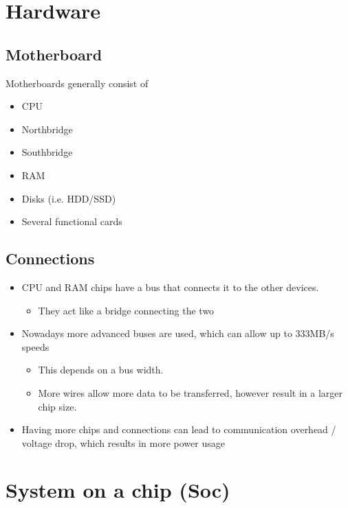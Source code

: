 \documentclass{article}
\begin{document}
\tableofcontents

\newpage

\section{Hardware}

\subsection{Motherboard}
\begin{flushleft}
Motherboards generally consist of 
\begin{itemize}
	\item CPU
	\item Northbridge
	\item Southbridge
	\item RAM
	\item Disks (i.e. HDD/SSD)
	\item Several functional cards	
\end{itemize}
\end{flushleft}

\subsection{Connections}
\begin{itemize}
  \item CPU and RAM chips have a bus that connects it to the other devices.
  \begin{itemize}
    \item They act like a bridge connecting the two
  \end{itemize}
  \item Nowadays more advanced buses are used, which can allow up to 333MB/s speeds
  \begin{itemize}
    \item This depends on a bus width.
    \item More wires allow more data to be transferred, however result in a larger chip size.
  \end{itemize}
   \item Having more chips and connections can lead to communication overhead / voltage drop, which results in more power usage
\end{itemize}

\section{System on a chip (Soc)}
\end{document}
